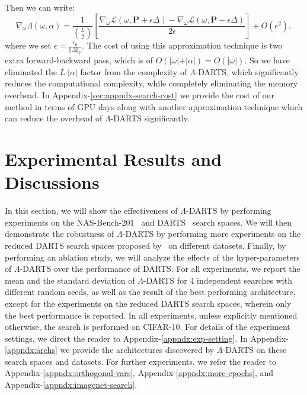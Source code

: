 \documentclass{article} \usepackage{fancyhdr, iclr2023_conference, times}
\def\mP{{\bm{P}}}
\newcommand{\mydarts}{$\Lambda$-DARTS\xspace}
\begin{document}
Then we can write:
\begin{equation}
    \nabla_\omega \Lambda(\omega, \alpha)=\frac{1}{\binom{L}{2}} \left[\frac{\nabla_\omega \mathcal{L}(\omega, \mP+\epsilon \Delta)-\nabla_\omega \mathcal{L}(\omega, \mP-\epsilon \Delta)}{2\epsilon}\right]+O(\epsilon^2),
    \label{eqn:approx}
\end{equation}
where we set $\epsilon=\frac{\epsilon_0}{\Vert \Delta\Vert_F}$. The cost of using this approximation technique is two extra forward-backward pass, which is of $O(\vert \omega\vert +\vert \alpha \vert)=O(\vert\omega\vert)$. So we have eliminated the $L\cdot \vert \alpha\vert$ factor from the complexity of \mydarts, which significantly reduces the computational complexity, while completely eliminating the memory overhead. In Appendix-\ref{sec:appndx-search-cost} we provide the cost of our method in terms of GPU days along with another approximation technique which can reduce the overhead of \mydarts significantly.
\section{Experimental Results and Discussions}
In this section, we will show the effectiveness of \mydarts by performing experiments on the NAS-Bench-201~\citep{DBLP:conf/iclr/Dong020} and DARTS~\citep{DBLP:conf/iclr/LiuSY19} search spaces. We will then demonstrate the robustness of \mydarts by performing more experiments on the reduced DARTS search spaces proposed by~\citep{DBLP:conf/iclr/ZelaESMBH20} on different datasets. Finally, by performing an ablation study, we will analyze the effects of the hyper-parameters of \mydarts over the performance of DARTS. For all experiments, we report the mean and the standard deviation of \mydarts for 4 independent searches with different random seeds, as well as the result of the best performing architecture, except for the experiments on the reduced DARTS search spaces, wherein only the best performance is reported. In all experiments, unless explicitly mentioned otherwise, the search is performed on CIFAR-10. For details of the experiment settings, we direct the reader to Appendix-\ref{appndx:exp-setting}. In Appendix-\ref{appndx:archs} we provide the architectures discovered by \mydarts on these search spaces and datasets. For further experiments, we refer the reader to Appendix-\ref{appndx:orthogonal-vars}, Appendix-\ref{appndx:more-epochs}, and Appendix-\ref{appndx:imagenet-search}.
\end{document}
